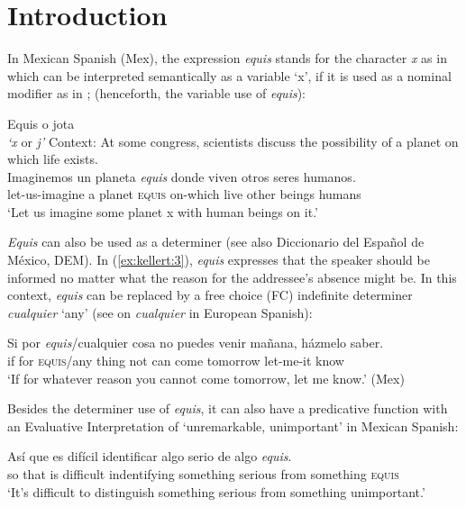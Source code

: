 \documentclass[output=paper]{langsci/langscibook}
\author{Olga Kellert\affiliation{Georg-August-Universität Göttingen}}
\begin{document}
\maketitle
\section{Introduction}\label{sec:kellert:1}
In Mexican Spanish (Mex), the expression \textit{equis} stands for the character \textit{x} as in  which can be interpreted semantically as a variable ‘x’, if it is used as a nominal modifier as in ; (henceforth, the variable use of \textit{equis}):

\ea\label{ex:kellert:1}
Equis o jota\\
\textit{`x} or \textit{j'}
\ex \label{ex:kellert:2}
Context: At some congress, scientists discuss the possibility of a planet on which life exists.\\
\gll Imaginemos un planeta \textit{equis} donde viven otros seres humanos.\\
let-us-imagine a planet \textsc{equis} on-which live other beings humans\\
\glt `Let us imagine some planet x with human beings on it.'
\z

\textit{Equis} can also be used as a determiner (see also Diccionario del Español de México, DEM). In (\ref{ex:kellert:3}), \textit{equis} expresses that the speaker should be informed no matter what the reason for the addressee’s absence might be. In this context, \textit{equis} can be replaced by a free choice (FC) indefinite determiner \textit{cualquier} ‘any’ (see \citealt{AM2011} on \textit{cualquier} in European Spanish):

\ea\label{ex:kellert:3}
\gll Si por \textit{equis}/cualquier cosa no puedes venir mañana, házmelo saber.\\
if for \textsc{equis}/any thing not can come tomorrow let-me-it know\\
\glt ‘If for whatever reason you cannot come tomorrow, let me know.’ (Mex)
\z

Besides the determiner use of \textit{equis}, it can also have a predicative function with an Evaluative Interpretation of ‘unremarkable, unimportant’ in Mexican Spanish:

\ea\label{ex:kellert:4}
\gll Así que es difícil identificar algo serio de algo \textit{equis}.\\
so that is difficult indentifying something serious from something \textsc{equis}\\
\glt ‘It’s difficult to distinguish something serious from something unimportant.’
\z
\end{document}
